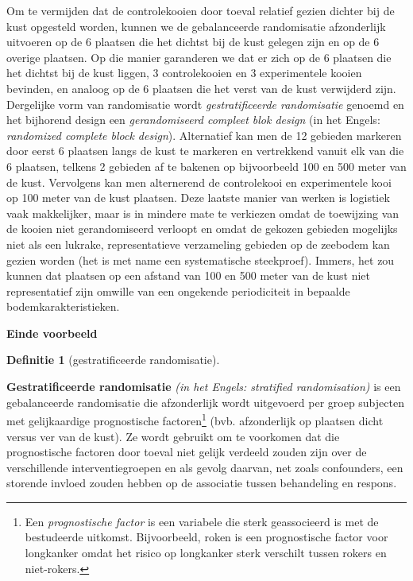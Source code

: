 \documentclass[
  12pt,dutch,coursenotes]{book}
\theoremstyle{definition}
\newtheorem{definition}{Definitie}[chapter]
\theoremstyle{definition}
\theoremstyle{definition}
\theoremstyle{remark}
\begin{document}
Om te vermijden dat de controlekooien door toeval relatief gezien dichter bij de kust opgesteld worden, kunnen we de gebalanceerde randomisatie afzonderlijk uitvoeren op de 6 plaatsen die het dichtst bij de kust gelegen zijn en op de 6 overige plaatsen. Op die manier garanderen we dat er zich op de 6 plaatsen die het dichtst bij de kust liggen, 3 controlekooien en 3 experimentele kooien bevinden, en analoog op de 6 plaatsen die het verst van de kust verwijderd zijn. Dergelijke vorm van randomisatie wordt \emph{gestratificeerde randomisatie}
genoemd en het bijhorend design een \emph{gerandomiseerd compleet blok design} (in het Engels: \emph{randomized complete block design}). Alternatief kan men de 12 gebieden markeren door eerst 6 plaatsen langs de kust te markeren en vertrekkend vanuit elk van die 6 plaatsen, telkens 2 gebieden af te bakenen op bijvoorbeeld 100 en 500 meter van de kust. Vervolgens kan men alternerend de controlekooi en experimentele kooi op 100 meter van de kust plaatsen. Deze laatste manier van werken is logistiek vaak makkelijker, maar is in mindere mate te verkiezen omdat de toewijzing van de kooien niet gerandomiseerd verloopt en omdat de gekozen gebieden mogelijks niet als een lukrake, representatieve verzameling gebieden op de zeebodem kan gezien worden (het is met name een systematische steekproef). Immers, het zou kunnen dat plaatsen op een afstand van 100 en 500 meter van de kust niet representatief zijn omwille van een ongekende periodiciteit in bepaalde bodemkarakteristieken.

\textbf{Einde voorbeeld}

\begin{definition}[gestratificeerde randomisatie]
\protect\hypertarget{def:unnamed-chunk-72}{}{\label{def:unnamed-chunk-72} \iffalse (gestratificeerde randomisatie) \fi{} }
\end{definition}
\textbf{Gestratificeerde randomisatie} \emph{(in het Engels: stratified
randomisation)} is een gebalanceerde randomisatie die afzonderlijk wordt
uitgevoerd per groep subjecten met gelijkaardige prognostische factoren\footnote{Een \emph{prognostische factor} is een variabele die sterk geassocieerd is met de
  bestudeerde uitkomst. Bijvoorbeeld, roken is een prognostische factor voor
  longkanker omdat het risico op longkanker sterk verschilt tussen rokers en
  niet-rokers.}
(bvb. afzonderlijk op plaatsen dicht versus ver van de kust). Ze wordt gebruikt
om te voorkomen dat die prognostische factoren door toeval niet gelijk
verdeeld zouden zijn over de verschillende interventiegroepen en als gevolg
daarvan, net zoals confounders, een storende invloed zouden hebben op de
associatie tussen behandeling en respons.
\end{document}
